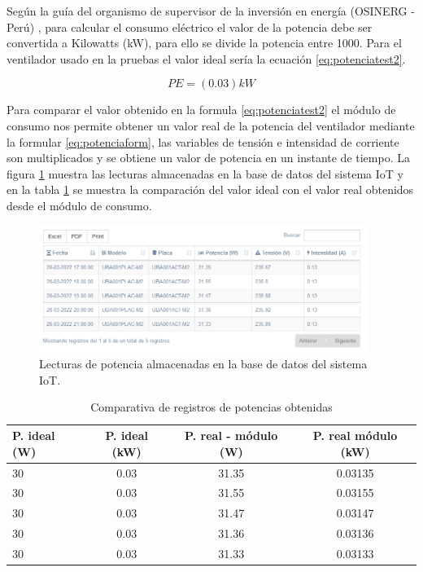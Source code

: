 Según la guía del organismo de supervisor de la inversión en energía (OSINERG - Perú) \citep{BOOK:3}, para calcular el consumo eléctrico el valor de la potencia  debe ser convertida a Kilowatts (kW), para ello se divide la potencia entre 1000. Para el ventilador usado en la pruebas el valor ideal sería la ecuación \ref{eq:potenciatest2}.

\begin{equation}
	\label{eq:potenciatest2}
	PE = \left( 0.03 \right) kW
\end{equation}

Para comparar el valor obtenido en la formula \ref{eq:potenciatest2} el módulo de consumo nos permite obtener un valor real de la potencia del ventilador mediante la formular \ref{eq:potenciaform}, las variables de tensión e intensidad de corriente son multiplicados y se obtiene un valor de potencia en un instante de tiempo. La figura \ref{fig:registroPotencia} muestra las lecturas almacenadas en la base de datos del sistema IoT y en la tabla \ref{tab:tablapotencias} se muestra la comparación del valor ideal con el valor real obtenidos desde el módulo de consumo.

\begin{figure}[htpb]
\centering 
\includegraphics[width=0.95\textwidth]{./Figures/test/consumo/lecturas.png}
\caption{Lecturas de potencia almacenadas en la base de datos del sistema IoT.}
\label{fig:registroPotencia}
\end{figure}


\begin{table}[h]
	\centering
	\caption[Comparativa de registros de potencias obtenidas]{Comparativa de registros de potencias obtenidas}
	\begin{tabular}{l c c c}    
		\toprule
		\textbf{P. ideal (W)} 	 & \textbf{P. ideal (kW)}  & \textbf{P. real - módulo (W)} &\textbf{P. real módulo (kW)} \\
		\midrule
		30 & 0.03 & 31.35 & 0.03135\\		
		30& 0.03 & 31.55  &0.03155 \\
		30& 0.03 & 31.47 & 0.03147\\		
		30& 0.03 & 31.36 & 0.03136\\		
		30& 0.03 & 31.33 & 0.03133\\
		\bottomrule
		\hline
	\end{tabular}
	\label{tab:tablapotencias}
\end{table}

